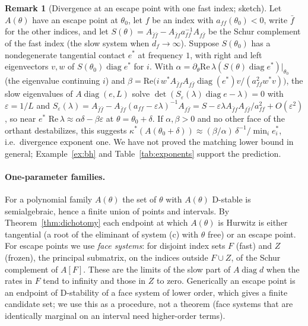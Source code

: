 \documentclass[11pt,a4paper]{article}
\theoremstyle{plain}
\theoremstyle{definition}
\newtheorem{remark}[theorem]{Remark}
\newcommand{\diag}{\operatorname{diag}}
\newcommand{\ks}{\kappa^{*}}
\begin{document}
\begin{remark}[Divergence at an escape point with one fast index; sketch]\label{rem:p1}
Let $A(\theta)$ have an escape point at $\theta_0$, let $f$ be an index with $a_{ff}(\theta_0)<0$, write $\bar f$ for the
other indices, and let $S(\theta)=A_{\bar f\bar f}-A_{\bar ff}a_{ff}^{-1}A_{f\bar f}$ be the Schur complement of the fast
index (the slow system when $d_f\to\infty$). Suppose $S(\theta_0)$ has a nondegenerate tangential contact $e^{*}$ at
frequency $1$, with right and left eigenvectors $v,w$ of $S(\theta_0)\diag e^{*}$ for $i$. With
$\alpha=\partial_\theta\mathrm{Re}\,\lambda(S(\theta)\diag e^{*})|_{\theta_0}$ (the eigenvalue continuing $i$) and
$\beta=\mathrm{Re}\bigl(i\,w^{*}A_{\bar ff}A_{f\bar f}\diag(e^{*})v/(a_{ff}^2w^{*}v)\bigr)$, the slow eigenvalues of
$A\diag(e,L)$ solve $\det(S_\varepsilon(\lambda)\diag e-\lambda)=0$ with $\varepsilon=1/L$ and
$S_\varepsilon(\lambda)=A_{\bar f\bar f}-A_{\bar ff}(a_{ff}-\varepsilon\lambda)^{-1}A_{f\bar f}
=S-\varepsilon\lambda A_{\bar ff}A_{f\bar f}/a_{ff}^2+O(\varepsilon^2)$, so near $e^{*}$
$\mathrm{Re}\,\lambda\approx\alpha\delta-\beta\varepsilon$ at $\theta=\theta_0+\delta$. If $\alpha,\beta>0$ and no other
face of the orthant destabilizes, this suggests $\ks(A(\theta_0+\delta))\approx(\beta/\alpha)\,\delta^{-1}/\min_ie^{*}_i$,
i.e.\ divergence exponent one. We have not proved the matching lower bound in general; Example~\ref{ex:bh} and
Table~\ref{tab:exponents} support the prediction.
\end{remark}

\paragraph{One-parameter families.} For a polynomial family $A(\theta)$ the set of $\theta$ with $A(\theta)$
D-stable is semialgebraic, hence a finite union of points and intervals. By Theorem~\ref{thm:dichotomy} each
endpoint at which $A(\theta)$ is Hurwitz is either tangential (a root of the eliminant of system (c) with $\theta$
free) or an escape point. For escape points we use \emph{face systems}: for disjoint index sets $F$ (fast) and $Z$
(frozen), the principal submatrix, on the indices outside $F\cup Z$, of the Schur complement of $A[F]$. These are the
limits of the slow part of $A\diag d$ when the rates in $F$ tend to infinity and those in $Z$ to zero. Generically an escape point is an endpoint of D-stability of a face system of lower order, which
gives a finite candidate set; we use this as a procedure, not a theorem (face systems that are identically marginal
on an interval need higher-order terms).
\end{document}
